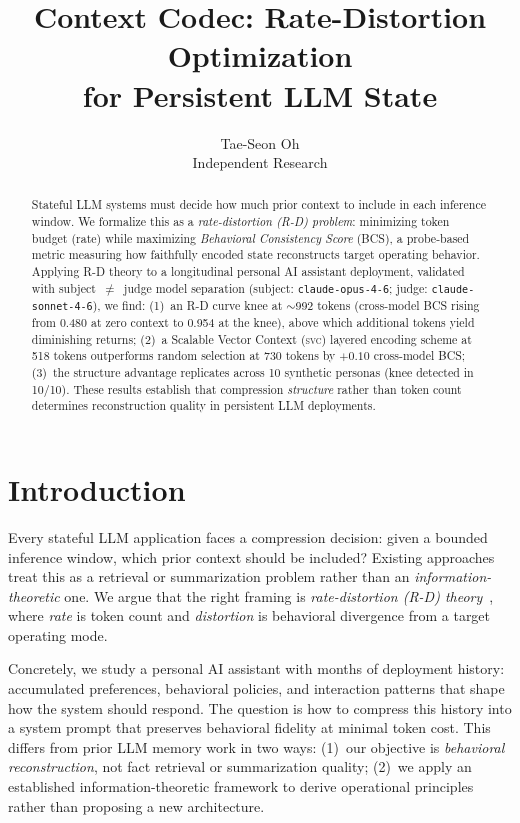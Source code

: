 \documentclass[10pt,twocolumn]{article}
\title{\textbf{Context Codec: Rate-Distortion Optimization\\for Persistent LLM State}}
\author{
  Tae-Seon Oh \\
  Independent Research
}
\date{}
\newcommand{\svc}{\textsc{svc}}
\begin{document}
\sloppy

\maketitle

\begin{abstract}
Stateful LLM systems must decide how much prior context to include in
each inference window. We formalize this as a \emph{rate-distortion (R-D)
problem}: minimizing token budget (rate) while maximizing \emph{Behavioral
Consistency Score} (BCS), a probe-based metric measuring how faithfully
encoded state reconstructs target operating behavior. Applying R-D theory
to a longitudinal personal AI assistant deployment, validated with
subject~$\neq$~judge model separation
(subject: \texttt{claude-opus-4-6}; judge: \texttt{claude-sonnet-4-6}),
we find:
(1)~an R-D curve knee at $\sim$992 tokens (cross-model BCS rising from
0.480 at zero context to 0.954 at the knee), above which additional
tokens yield diminishing returns;
(2)~a Scalable Vector Context (\svc) layered encoding scheme at 518
tokens outperforms random selection at 730 tokens by $+0.10$ cross-model
BCS;
(3)~the structure advantage replicates across 10 synthetic personas
(knee detected in 10/10).
These results establish that compression \emph{structure} rather than
token count determines reconstruction quality in persistent LLM deployments.
\end{abstract}

\section{Introduction}

Every stateful LLM application faces a compression decision: given a
bounded inference window, which prior context should be included?
Existing approaches treat this as a retrieval or summarization problem
rather than an \emph{information-theoretic} one. We argue that the right
framing is \emph{rate-distortion (R-D) theory}~\cite{shannon1948},
where \emph{rate} is token count and \emph{distortion} is
behavioral divergence from a target operating mode.

Concretely, we study a personal AI assistant with months of deployment
history: accumulated preferences, behavioral policies, and interaction
patterns that shape how the system should respond. The question is how
to compress this history into a system prompt that preserves behavioral
fidelity at minimal token cost. This differs from prior LLM memory work
in two ways: (1)~our objective is \emph{behavioral reconstruction}, not
fact retrieval or summarization quality; (2)~we apply an established
information-theoretic framework to derive operational principles rather
than proposing a new architecture.
\end{document}

